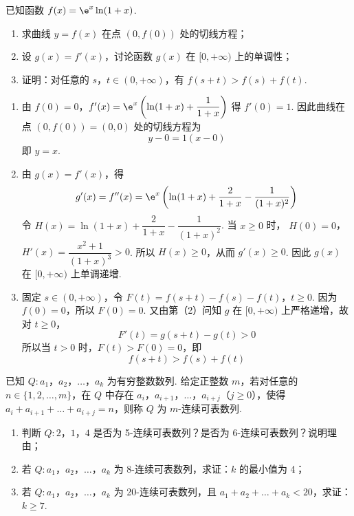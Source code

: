\begin{problem}
已知函数 \(f(x)=\e^x\ln(1+x)\).

\begin{enumerate}
\item 求曲线 \(y=f(x)\) 在点 \((0,f(0))\) 处的切线方程；

\item 设 \(g(x)=f'(x)\)，讨论函数 \(g(x)\) 在 \([0,+\infty)\) 上的单调性；

\item 证明：对任意的 \(s\)，\(t\in(0,+\infty)\)，有 \(f(s+t)>f(s)+f(t)\).
\end{enumerate}
\end{problem}

\begin{solution}
\begin{enumerate}
\item 由
\(f(0)=0\)，\(f'(x)=\e^x\left(\ln(1+x)+\dfrac{1}{1+x}\right)\)
得 \(f'(0)=1\). 因此曲线在点 \((0,f(0))=(0,0)\) 处的切线方程为
\[
y-0=1(x-0)
\]
即 \(y=x\).

\item 由 \(g(x)=f'(x)\)，得
\[
g'(x)=f''(x)=\e^x\left(\ln(1+x)+\dfrac{2}{1+x}-\dfrac{1}{(1+x)^2}\right)
\]
令 \(H(x)=\ln(1+x)+\dfrac{2}{1+x}-\dfrac{1}{(1+x)^2}\). 当 \(x\geq0\) 时，
\(H(0)=0\)，\(H'(x)=\dfrac{x^2+1}{(1+x)^3}>0\).
所以 \(H(x)\geq0\)，从而 \(g'(x)\geq0\). 因此 \(g(x)\) 在 \([0,+\infty)\) 上单调递增.

\item 固定 \(s\in(0,+\infty)\)，令
\(F(t)=f(s+t)-f(s)-f(t)\)，\(t\geq0\).
因为 \(f(0)=0\)，所以 \(F(0)=0\). 又由第（2）问知 \(g\) 在 \([0,+\infty)\) 上严格递增，故对 \(t\geq0\)，
\[
F'(t)=g(s+t)-g(t)>0
\]
所以当 \(t>0\) 时，\(F(t)>F(0)=0\)，即
\[
f(s+t)>f(s)+f(t)
\]
\end{enumerate}
\end{solution}

\begin{problem}
已知 \(Q:a_1\)，\(a_2\)，\(\dots\)，\(a_k\) 为有穷整数数列. 给定正整数 \(m\)，若对任意的 \(n\in\{1,2,\dots,m\}\)，在 \(Q\) 中存在 \(a_i\)，\(a_{i+1}\)，\(\dots\)，\(a_{i+j}\)（\(j\ge 0\)），使得 \(a_i+a_{i+1}+\dots+a_{i+j}=n\)，则称 \(Q\) 为 \(m\)-连续可表数列.

\begin{enumerate}
\item 判断 \(Q:2\)，\(1\)，\(4\) 是否为 5-连续可表数列？是否为 6-连续可表数列？说明理由；

\item 若 \(Q:a_1\)，\(a_2\)，\(\dots\)，\(a_k\) 为 8-连续可表数列，求证：\(k\) 的最小值为 4；

\item 若 \(Q:a_1\)，\(a_2\)，\(\dots\)，\(a_k\) 为 20-连续可表数列，且 \(a_1+a_2+\dots+a_k<20\)，求证：\(k\ge 7\).
\end{enumerate}
\end{problem}

